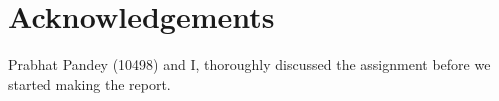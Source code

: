 \section{Acknowledgements}
Prabhat Pandey (10498) and I, thoroughly discussed the assignment before we started making the report.